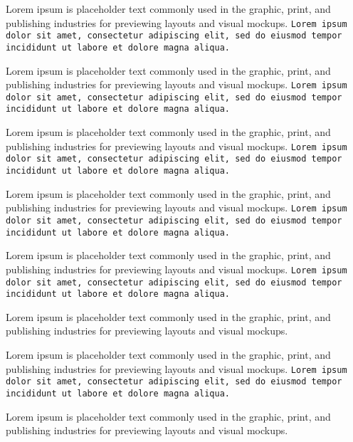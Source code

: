\documentclass[11pt]{ctexart}
\begin{document}
Lorem ipsum is placeholder text commonly used in the graphic, print, and publishing industries for previewing layouts and visual mockups.
\texttt{Lorem ipsum dolor sit amet, consectetur adipiscing elit, sed do eiusmod tempor incididunt ut labore et dolore magna aliqua.}

Lorem ipsum is placeholder text commonly used in the graphic, print, and publishing industries for previewing layouts and visual mockups.
\texttt{Lorem ipsum dolor sit amet, consectetur adipiscing elit, sed do eiusmod tempor incididunt ut labore et dolore magna aliqua.}

Lorem ipsum is placeholder text commonly used in the graphic, print, and publishing industries for previewing layouts and visual mockups.
\texttt{Lorem ipsum dolor sit amet, consectetur adipiscing elit, sed do eiusmod tempor incididunt ut labore et dolore magna aliqua.}

Lorem ipsum is placeholder text commonly used in the graphic, print, and publishing industries for previewing layouts and visual mockups.
\texttt{Lorem ipsum dolor sit amet, consectetur adipiscing elit, sed do eiusmod tempor incididunt ut labore et dolore magna aliqua.}

Lorem ipsum is placeholder text commonly used in the graphic, print, and publishing industries for previewing layouts and visual mockups.
\texttt{Lorem ipsum dolor sit amet, consectetur adipiscing elit, sed do eiusmod tempor incididunt ut labore et dolore magna aliqua.}

Lorem ipsum is placeholder text commonly used in the graphic, print, and publishing industries for previewing layouts and visual mockups.

Lorem ipsum is placeholder text commonly used in the graphic, print, and publishing industries for previewing layouts and visual mockups.
\texttt{Lorem ipsum dolor sit amet, consectetur adipiscing elit, sed do eiusmod tempor incididunt ut labore et dolore magna aliqua.}

Lorem ipsum is placeholder text commonly used in the graphic, print, and publishing industries for previewing layouts and visual mockups.
\end{document}
